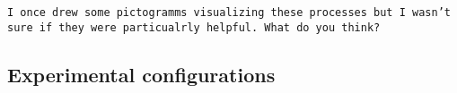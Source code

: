 \texttt{I once drew some pictogramms visualizing these processes but I wasn't sure if they were particualrly helpful. What do you think?}



\subsection*{Experimental configurations}



